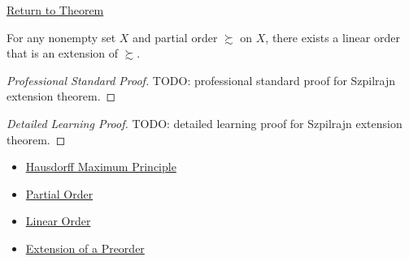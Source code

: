 \newpage
{}
\label{prf:szpilrajn}

\begin{remark*}[Return]
\hyperref[thm:szpilrajn]{Return to Theorem}
\end{remark*}

\begin{theorem*}
For any nonempty set $X$ and partial order $\succsim$ on $X$, there exists a
linear order that is an extension of $\succsim$.
\end{theorem*}

\begin{proof}[Professional Standard Proof]
\LRAProofBodyStart
TODO: professional standard proof for Szpilrajn extension theorem.
\end{proof}

\begin{proof}[Detailed Learning Proof]
\LRAProofBodyStart
TODO: detailed learning proof for Szpilrajn extension theorem.
\end{proof}

\begin{remark*}
\end{remark*}

\begin{dependencies}
\begin{itemize}
  \item \hyperref[thm:hausdorff]{Hausdorff Maximum Principle}
  \item \hyperref[def:partial-order]{Partial Order}
  \item \hyperref[def:total-order]{Linear Order}
  \item \hyperref[def:preorder-extension]{Extension of a Preorder}
\end{itemize}
\end{dependencies}

\clearpage
